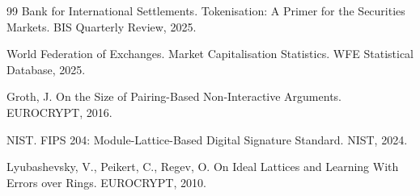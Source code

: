 \documentclass[11pt,letterpaper]{article}
\begin{document}
\begin{thebibliography}{99}
Bank for International Settlements.
\newblock Tokenisation: A Primer for the Securities Markets.
\newblock BIS Quarterly Review, 2025.

World Federation of Exchanges.
\newblock Market Capitalisation Statistics.
\newblock WFE Statistical Database, 2025.

Groth, J.
\newblock On the Size of Pairing-Based Non-Interactive Arguments.
\newblock EUROCRYPT, 2016.

NIST.
\newblock FIPS 204: Module-Lattice-Based Digital Signature Standard.
\newblock NIST, 2024.

Lyubashevsky, V., Peikert, C., Regev, O.
\newblock On Ideal Lattices and Learning With Errors over Rings.
\newblock EUROCRYPT, 2010.

\end{thebibliography}
\end{document}
